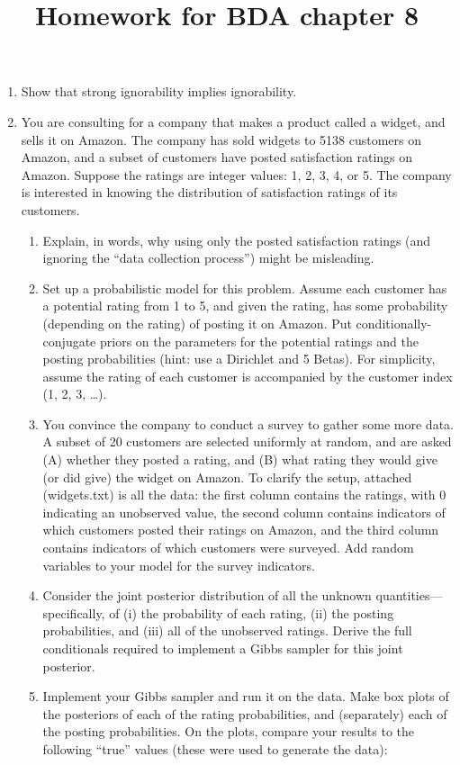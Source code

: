 \documentclass[12pt]{article}
\title{Homework for BDA chapter 8}
\date{}
\begin{document}
\maketitle

\begin{enumerate}
\item Show that strong ignorability implies ignorability.
\item You are consulting for a company that makes a product called a widget, and sells it on Amazon. The company has sold widgets to 5138 customers on Amazon, and a subset of customers have posted satisfaction ratings on Amazon. Suppose the ratings are integer values: 1, 2, 3, 4, or 5.  The company is interested in knowing the distribution of satisfaction ratings of its customers. 
\begin{enumerate}
\item Explain, in words, why using only the posted satisfaction ratings (and ignoring the ``data collection process'') might be misleading.
\item Set up a probabilistic model for this problem. Assume each customer has a potential rating from 1 to 5, and given the rating, has some probability (depending on the rating) of posting it on Amazon. Put conditionally-conjugate priors on the parameters for the potential ratings and the posting probabilities (hint: use a Dirichlet and 5 Betas). For simplicity, assume the rating of each customer is accompanied by the customer index (1, 2, 3, \dots).
\item You convince the company to conduct a survey to gather some more data.  A subset of 20 customers are selected uniformly at random, and are asked (A) whether they posted a rating, and (B) what rating they would give (or did give) the widget on Amazon.  To clarify the setup, attached (widgets.txt) is all the data: the first column contains the ratings, with 0 indicating an unobserved value, the second column contains indicators of which customers posted their ratings on Amazon, and the third column contains indicators of which customers were surveyed. Add random variables to your model for the survey indicators.
\item Consider the joint posterior distribution of all the unknown quantities---specifically, of (i) the probability of each rating, (ii) the posting probabilities, and (iii) all of the unobserved ratings. Derive the full conditionals required to implement a Gibbs sampler for this joint posterior.
\item Implement your Gibbs sampler and run it on the data. Make box plots of the posteriors of each of the rating probabilities, and (separately) each of the posting probabilities. On the plots, compare your results to the following ``true'' values (these were used to generate the data):

\end{enumerate}
\end{enumerate}
\end{document}
